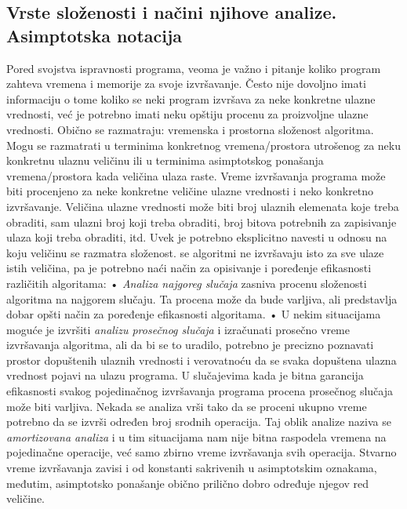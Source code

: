 \documentclass{article}
\begin{document}
\subsection{Vrste složenosti i načini njihove analize. Asimptotska notacija}
Pored svojstva ispravnosti programa, veoma je važno i pitanje koliko program zahteva vremena i memorije za svoje izvršavanje. Često nije dovoljno imati informaciju o tome koliko se neki program izvršava za neke konkretne ulazne vrednosti, već je potrebno imati neku opštiju procenu za proizvoljne ulazne vrednosti. Obično se razmatraju: vremenska i prostorna složenost algoritma. Mogu se razmatrati u terminima konkretnog vremena/prostora utrošenog za neku konkretnu ulaznu veličinu ili u terminima asimptotskog ponašanja vremena/prostora kada veličina ulaza raste.
\newline Vreme izvršavanja programa može biti procenjeno za neke konkretne veličine ulazne vrednosti i neko konkretno izvršavanje. Veličina ulazne vrednosti može biti broj ulaznih elemenata koje treba obraditi, sam ulazni broj koji treba obraditi, broj bitova potrebnih za zapisivanje ulaza koji treba obraditi, itd. Uvek je potrebno eksplicitno navesti u odnosu na koju veličinu se razmatra složenost. 
 se algoritmi ne izvršavaju isto za sve ulaze istih veličina, pa je potrebno naći način za opisivanje i poređenje efikasnosti različitih algoritama:
\newline \hspace*{0.4cm}• \textit{Analiza najgoreg slučaja} zasniva procenu složenosti algoritma na najgorem slučaju. Ta procena može da bude varljiva, ali predstavlja dobar opšti način za poređenje 	efikasnosti algoritama.
\newline \hspace*{0.4cm}• U nekim situacijama moguće je izvršiti \textit{analizu prosečnog slučaja} i izračunati prosečno vreme izvršavanja algoritma, ali da bi se to uradilo, potrebno je precizno poznavati prostor dopuštenih ulaznih vrednosti i verovatnoću da se svaka dopuštena ulazna vrednost pojavi na 	ulazu programa. U slučajevima kada je bitna garancija efikasnosti svakog pojedinačnog izvršavanja programa procena prosečnog slučaja može biti varljiva.
\newline Nekada se analiza vrši tako da se proceni ukupno vreme potrebno da se izvrši određen broj srodnih operacija. Taj oblik analize naziva se \textit{amortizovana analiza} i u tim situacijama nam nije bitna raspodela vremena na pojedinačne operacije, već samo zbirno vreme izvršavanja svih operacija. Stvarno vreme izvršavanja zavisi i od konstanti sakrivenih u asimptotskim oznakama, međutim, asimptotsko ponašanje obično prilično dobro određuje njegov red veličine.
\end{document}
